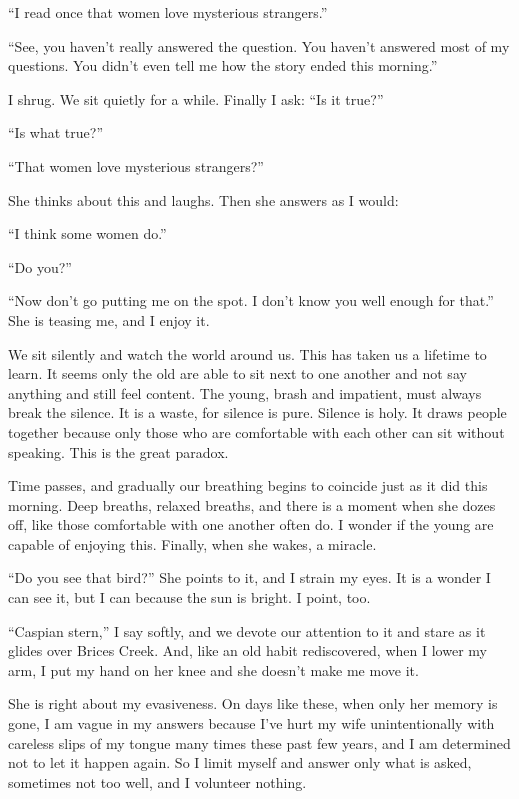 \documentclass[10pt, twoside, openright]{book}
\begin{document}
``I read once that women love mysterious strangers.''


``See, you haven't really answered the question. You haven't answered
most of my questions. You didn't even tell me how the story ended this
morning.''


I shrug. We sit quietly for a while. Finally I ask: ``Is it true?''

``Is what true?''

``That women love mysterious strangers?''

She thinks about this and laughs. Then she answers as I would:

``I think some women do.''

``Do you?''


``Now don't go putting me on the spot. I don't know you well enough for
that.'' She is teasing me, and I enjoy it.

We sit silently and watch the world around us. This has taken us a
lifetime to learn. It seems only the old are able to sit next to one
another and not say anything and still feel content. The young, brash
and impatient, must always break the silence. It is a waste, for silence
is pure. Silence is holy. It draws people together because only those
who are comfortable with each other can sit without speaking. This is
the great paradox.

Time passes, and gradually our breathing begins to coincide just as it
did this morning. Deep breaths, relaxed breaths, and there is a moment
when she dozes off, like those comfortable with one another often do. I
wonder if the young are capable of enjoying this. Finally, when she
wakes, a miracle.

``Do you see that bird?'' She points to it, and I strain my eyes. It is
a wonder I can see it, but I can because the sun is bright. I point,
too.

``Caspian stern,'' I say softly, and we devote our attention to it and
stare as it glides over Brices Creek. And, like an old habit
rediscovered, when I lower my arm, I put my hand on her knee and she
doesn't make me move it.

She is right about my evasiveness. On days like these, when only her
memory is gone, I am vague in my answers because I've hurt my wife
unintentionally with careless slips of my tongue many times these past
few years, and I am determined not to let it happen again. So I limit
myself and answer only what is asked, sometimes not too well, and I
volunteer nothing.
\end{document}
